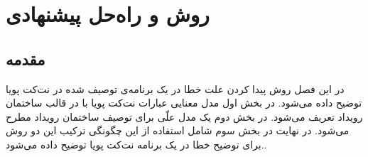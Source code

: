 \chapter{روش و راه‌حل پیشنهادی}
\section{مقدمه}
در این فصل روش پیدا کردن علت خطا در یک برنامه‌ی توصیف شده در نت‌کت پویا توضیح داده می‌شود.
در بخش اول مدل معنایی عبارات نت‌کت پویا با در قالب ساختمان رویداد تعریف می‌شود.
در بخش دوم یک مدل علّی برای توصیف ساختمان رویداد مطرح می‌شود.
در نهایت در بخش سوم شامل استفاده از این چگونگی ترکیب این دو روش برای توضیح خطا در یک برنامه نت‌کت پویا توضیح داده می‌شود..









